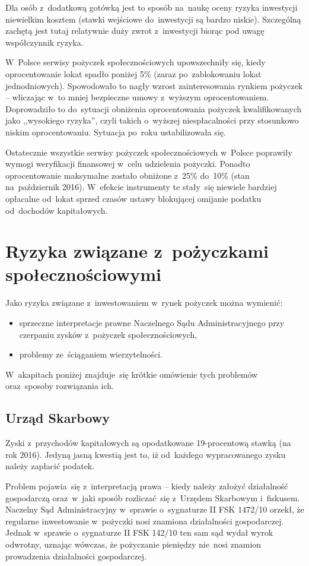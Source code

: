 \documentclass[a4paper,twoside,titlepage,openright]{book}
\begin{document}
Dla osób z~dodatkową gotówką jest to sposób na~naukę oceny ryzyka inwestycji niewielkim kosztem (stawki wejściowe do~inwestycji są bardzo niskie). Szczególną zachętą jest tutaj relatywnie duży zwrot z~inwestycji biorąc pod uwagę współczynnik ryzyka. 

W~Polsce serwisy pożyczek społecznościowych upowszechniły się, kiedy oprocentowanie lokat spadło poniżej 5\% (zaraz po~zablokowaniu lokat jednodniowych).\cite{antybelkowe} Spowodowało to nagły wzrost zainteresowania rynkiem pożyczek -- wliczając w~to mniej bezpieczne umowy z~wyższym oprocentowaniem. Doprowadziło to do~sytuacji obniżenia oprocentowania pożyczek kwalifikowanych jako ,,wysokiego ryzyka'', czyli takich o~wyższej niespłacalności przy stosunkowo niskim oprocentowaniu. Sytuacja po~roku ustabilizowała się. 

Ostatecznie wszystkie serwisy pożyczek społecznościowych w~Polsce poprawiły wymogi weryfikacji finansowej w~celu udzielenia pożyczki. Ponadto oprocentowanie maksymalne zostało obniżone z~25\% do~10\% (stan na~październik 2016). W~efekcie instrumenty te stały~się niewiele bardziej opłacalne od~lokat sprzed czasów ustawy blokującej omijanie podatku od~dochodów kapitałowych.
 
 
\section{Ryzyka związane z~pożyczkami społecznościowymi}

Jako ryzyka związane z~inwestowaniem w~rynek pożyczek można wymienić:

\begin{itemize}
\item sprzeczne interpretacje prawne Naczelnego Sądu Administracyjnego przy czerpaniu zysków z~pożyczek społecznościowych,
\item problemy ze~ściąganiem wierzytelności.
\end{itemize}

W~akapitach poniżej znajduje~się krótkie omówienie tych problemów oraz~sposoby rozwiązania ich.

\subsection*{Urząd Skarbowy}
Zyski z~przychodów kapitałowych są opodatkowane 19-procentową stawką (na rok 2016). Jedyną jasną kwestią jest to, iż od~każdego wypracowanego zysku należy zapłacić podatek. 

Problem pojawia~się z~interpretacją prawa -- kiedy należy założyć działalność gospodarczą oraz~w~jaki sposób rozliczać~się z~Urzędem Skarbowym i~fiskusem. Naczelny Sąd Administracyjny w~sprawie o~sygnaturze II FSK 1472/10 orzekł, że regularne inwestowanie w~pożyczki nosi znamiona działalności gospodarczej.\cite{nsaZnamiona} Jednak w~sprawie o~sygnaturze II FSK 142/10 ten sam sąd wydał wyrok odwrotny, uznając wówczas, że pożyczanie pieniędzy nie~nosi znamion prowadzenia działalności gospodarczej. \cite{nsaWyrokOdwrotny} 
\end{document}
